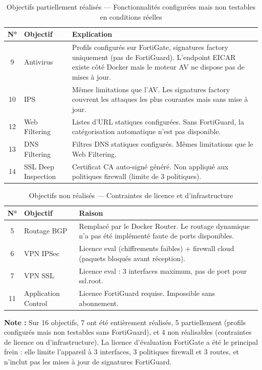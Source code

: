 \begin{table}[H]
\centering
\caption{Objectifs partiellement réalisés --- Fonctionnalités configurées mais non testables en conditions réelles}
\label{tab:objectifs-partiels}
\begin{tabularx}{\textwidth}{|c|X|X|}
\hline
\textbf{N°} & \textbf{Objectif} & \textbf{Explication} \\
\hline
9 & Antivirus & Profils configurés sur FortiGate, signatures factory uniquement (pas de FortiGuard). L'endpoint EICAR existe côté Docker mais le moteur AV ne dispose pas de mises à jour. \\
\hline
10 & IPS & Mêmes limitations que l'AV. Les signatures factory couvrent les attaques les plus courantes mais sans mise à jour. \\
\hline
12 & Web Filtering & Listes d'URL statiques configurées. Sans FortiGuard, la catégorisation automatique n'est pas disponible. \\
\hline
13 & DNS Filtering & Filtres DNS statiques configurés. Mêmes limitations que le Web Filtering. \\
\hline
14 & SSL Deep Inspection & Certificat CA auto-signé généré. Non appliqué aux politiques firewall (limite de 3 politiques). \\
\hline
\end{tabularx}
\end{table}

\begin{table}[H]
\centering
\caption{Objectifs non réalisés --- Contraintes de licence et d'infrastructure}
\label{tab:objectifs-non-realises}
\begin{tabularx}{\textwidth}{|c|X|X|}
\hline
\textbf{N°} & \textbf{Objectif} & \textbf{Raison} \\
\hline
5 & Routage BGP & Remplacé par le Docker Router. Le routage dynamique n'a pas été implémenté faute de ports disponibles. \\
\hline
6 & VPN IPSec & Licence eval (chiffrements faibles) + firewall cloud (paquets bloqués avant réception). \\
\hline
7 & VPN SSL & Licence eval : 3 interfaces maximum, pas de port pour ssl.root. \\
\hline
11 & Application Control & Licence FortiGuard requise. Impossible sans abonnement. \\
\hline
\end{tabularx}
\end{table}

\noindent\textbf{Note :} Sur 16 objectifs, 7 ont été entièrement réalisés, 5 partiellement (profils configurés mais non testables sans FortiGuard), et 4 non réalisables (contraintes de licence ou d'infrastructure). La licence d'évaluation FortiGate a été le principal frein : elle limite l'appareil à 3 interfaces, 3 politiques firewall et 3 routes, et n'inclut pas les mises à jour de signatures FortiGuard.

